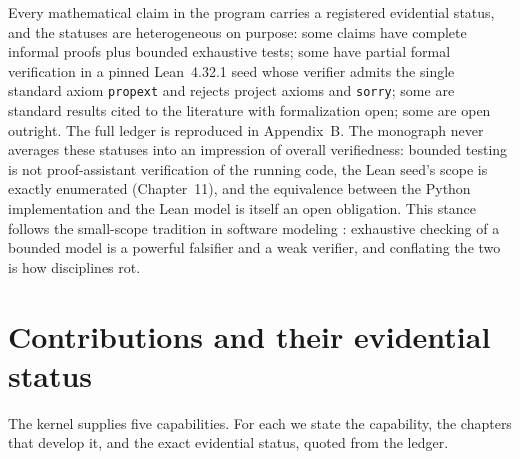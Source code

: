 Every mathematical claim in the program carries a registered evidential
status, and the statuses are heterogeneous on purpose: some claims have
complete informal proofs plus bounded exhaustive tests; some have partial
formal verification in a pinned Lean~4.32.1 seed \cite{lean4} whose verifier
admits the single standard axiom \texttt{propext} and rejects project axioms
and \texttt{sorry}; some are standard results cited to the literature with
formalization open; some are open outright. The full ledger is reproduced in
Appendix~B. The monograph never averages these statuses into an impression
of overall verifiedness: bounded testing is not proof-assistant verification
of the running code, the Lean seed's scope is exactly enumerated
(Chapter~11), and the equivalence between the Python implementation and the
Lean model is itself an open obligation. This stance follows the small-scope
tradition in software modeling \cite{jackson}: exhaustive checking of a
bounded model is a powerful falsifier and a weak verifier, and conflating the
two is how disciplines rot.

\section{Contributions and their evidential status}\label{ch01:sec:contributions}

The kernel supplies five capabilities. For each we state the capability, the
chapters that develop it, and the exact evidential status, quoted from the
ledger.

